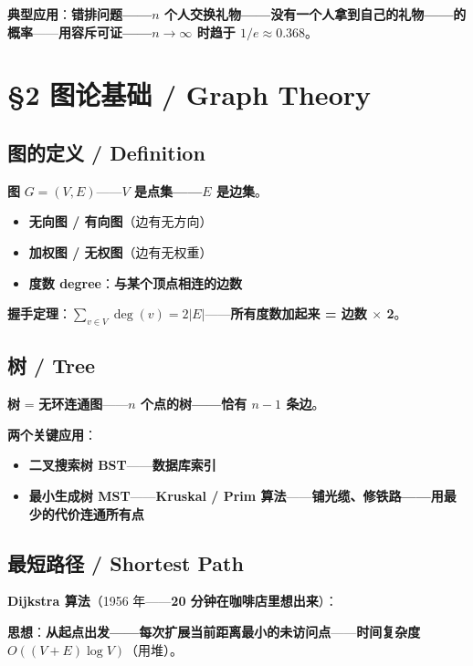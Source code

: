 \textbf{典型应用}：\textbf{错排问题——$n$ 个人交换礼物——\textbf{没有一个人拿到自己的礼物——的概率}}——\textbf{用容斥可证——\textbf{$n \to \infty$ 时趋于 $1/e \approx 0.368$}}。

\section{§2 图论基础 / Graph Theory}

\subsection{图的定义 / Definition}

\textbf{图} $G = (V, E)$——\textbf{$V$ 是点集——$E$ 是边集}。

\begin{itemize}
\item \textbf{无向图 / 有向图}（边有无方向）
\item \textbf{加权图 / 无权图}（边有无权重）
\item \textbf{度数 degree}：\textbf{与某个顶点相连的边数}
\end{itemize}

\textbf{握手定理}：$\sum_{v \in V} \deg(v) = 2|E|$——\textbf{所有度数加起来 = 边数 $\times$ 2}。

\subsection{树 / Tree}

\textbf{树} = \textbf{无环连通图}——\textbf{$n$ 个点的树——恰有 $n-1$ 条边}。

\textbf{两个关键应用}：

\begin{itemize}
\item \textbf{二叉搜索树 BST}——\textbf{数据库索引}
\item \textbf{最小生成树 MST}——\textbf{Kruskal / Prim 算法}——\textbf{铺光缆、修铁路——\textbf{用最少的代价连通所有点}}
\end{itemize}

\subsection{最短路径 / Shortest Path}

\textbf{Dijkstra 算法}（1956 年——\textbf{20 分钟在咖啡店里想出来}）：

\textbf{思想}：\textbf{从起点出发——\textbf{每次扩展当前距离最小的未访问点}}——\textbf{时间复杂度 $O((V+E)\log V)$}（用堆）。

